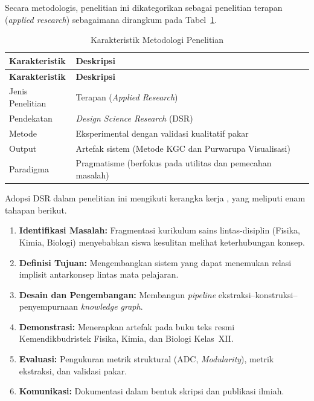 \documentclass[main]{subfiles}
\begin{document}
Secara metodologis, penelitian ini dikategorikan sebagai penelitian
terapan (\textit{applied research}) sebagaimana dirangkum pada
Tabel~\ref{tab:karakteristik}.

\begin{longtable}{@{}ll@{}}
  \caption{Karakteristik Metodologi Penelitian}
  \label{tab:karakteristik}\\
  \toprule
  \textbf{Karakteristik} & \textbf{Deskripsi} \\
  \midrule
  \endfirsthead
  \toprule
  \textbf{Karakteristik} & \textbf{Deskripsi} \\
  \midrule
  \endhead
  \midrule
  \endfoot
  \bottomrule
  \endlastfoot
  Jenis Penelitian & Terapan (\textit{Applied Research}) \\
  Pendekatan       & \textit{Design Science Research} (DSR) \\
  Metode           & Eksperimental dengan validasi kualitatif pakar \\
  Output           & Artefak sistem (Metode KGC dan Purwarupa Visualisasi) \\
  Paradigma        & Pragmatisme (berfokus pada utilitas dan pemecahan masalah) \\
\end{longtable}

Adopsi DSR dalam penelitian ini mengikuti kerangka kerja
\textcite{peffers_design_2007}, yang meliputi enam tahapan berikut.

\begin{enumerate}
  \item \textbf{Identifikasi Masalah:} Fragmentasi kurikulum sains
        lintas-disiplin (Fisika, Kimia, Biologi) menyebabkan siswa
        kesulitan melihat keterhubungan konsep.
  \item \textbf{Definisi Tujuan:} Mengembangkan sistem yang dapat
        menemukan relasi implisit antarkonsep lintas mata pelajaran.
  \item \textbf{Desain dan Pengembangan:} Membangun \textit{pipeline}
        ekstraksi--konstruksi--penyempurnaan \textit{knowledge graph}.
  \item \textbf{Demonstrasi:} Menerapkan artefak pada buku teks resmi
        Kemendikbudristek Fisika, Kimia, dan Biologi Kelas~XII.
  \item \textbf{Evaluasi:} Pengukuran metrik struktural (ADC,
        \textit{Modularity}), metrik ekstraksi, dan validasi pakar.
  \item \textbf{Komunikasi:} Dokumentasi dalam bentuk skripsi dan
        publikasi ilmiah.
\end{enumerate}
\end{document}

